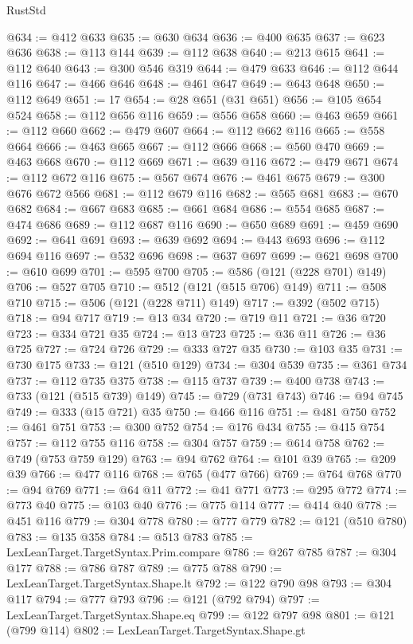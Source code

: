 \begin{lexlean}{RustStd}
\begin{coremodule}
@634 := @412 @633
@635 := @630 @634
@636 := @400 @635
@637 := @623 @636
@638 := @113 @144
@639 := @112 @638
@640 := @213 @615
@641 := @112 @640
@643 := @300 @546 @319
@644 := @479 @633
@646 := @112 @644 @116
@647 := @466 @646
@648 := @461 @647
@649 := @643 @648
@650 := @112 @649
@651 := 17
@654 := @28 @651 (@31 @651)
@656 := @105 @654 @524
@658 := @112 @656 @116
@659 := @556 @658
@660 := @463 @659
@661 := @112 @660
@662 := @479 @607
@664 := @112 @662 @116
@665 := @558 @664
@666 := @463 @665
@667 := @112 @666
@668 := @560 @470
@669 := @463 @668
@670 := @112 @669
@671 := @639 @116
@672 := @479 @671
@674 := @112 @672 @116
@675 := @567 @674
@676 := @461 @675
@679 := @300 @676 @672 @566
@681 := @112 @679 @116
@682 := @565 @681
@683 := @670 @682
@684 := @667 @683
@685 := @661 @684
@686 := @554 @685
@687 := @474 @686
@689 := @112 @687 @116
@690 := @650 @689
@691 := @459 @690
@692 := @641 @691
@693 := @639 @692
@694 := @443 @693
@696 := @112 @694 @116
@697 := @532 @696
@698 := @637 @697
@699 := @621 @698
@700 := @610 @699
@701 := @595 @700
@705 := @586 (@121 (@228 @701) @149)
@706 := @527 @705
@710 := @512 (@121 (@515 @706) @149)
@711 := @508 @710
@715 := @506 (@121 (@228 @711) @149)
@717 := @392 (@502 @715)
@718 := @94 @717
@719 := @13 @34
@720 := @719 @11
@721 := @36 @720
@723 := @334 @721 @35
@724 := @13 @723
@725 := @36 @11
@726 := @36 @725
@727 := @724 @726
@729 := @333 @727 @35
@730 := @103 @35
@731 := @730 @175
@733 := @121 (@510 @129)
@734 := @304 @539
@735 := @361 @734
@737 := @112 @735 @375
@738 := @115 @737
@739 := @400 @738
@743 := @733 (@121 (@515 @739) @149)
@745 := @729 (@731 @743)
@746 := @94 @745
@749 := @333 (@15 @721) @35
@750 := @466 @116
@751 := @481 @750
@752 := @461 @751
@753 := @300 @752
@754 := @176 @434
@755 := @415 @754
@757 := @112 @755 @116
@758 := @304 @757
@759 := @614 @758
@762 := @749 (@753 @759 @129)
@763 := @94 @762
@764 := @101 @39
@765 := @209 @39
@766 := @477 @116
@768 := @765 (@477 @766)
@769 := @764 @768
@770 := @94 @769
@771 := @64 @11
@772 := @41 @771
@773 := @295 @772
@774 := @773 @40
@775 := @103 @40
@776 := @775 @114
@777 := @414 @40
@778 := @451 @116
@779 := @304 @778
@780 := @777 @779
@782 := @121 (@510 @780)
@783 := @135 @358
@784 := @513 @783
@785 := LexLeanTarget.TargetSyntax.Prim.compare
@786 := @267 @785
@787 := @304 @177
@788 := @786 @787
@789 := @775 @788
@790 := LexLeanTarget.TargetSyntax.Shape.lt
@792 := @122 @790 @98
@793 := @304 @117
@794 := @777 @793
@796 := @121 (@792 @794)
@797 := LexLeanTarget.TargetSyntax.Shape.eq
@799 := @122 @797 @98
@801 := @121 (@799 @114)
@802 := LexLeanTarget.TargetSyntax.Shape.gt

\end{coremodule}
\end{lexlean}
